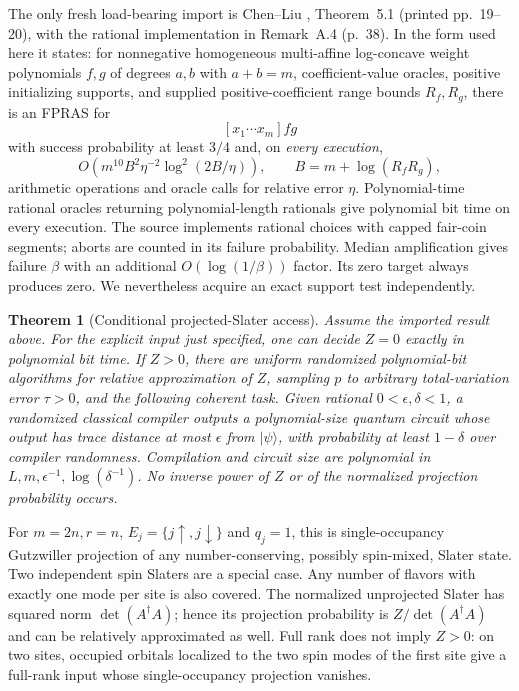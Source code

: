 \documentclass[11pt]{article}
\newtheorem{theorem}{Theorem}
\theoremstyle{remark}
\newcommand{\ket}[1]{\lvert #1\rangle}
\begin{document}
The only fresh load-bearing import is Chen--Liu \cite{CL}, Theorem~5.1 (printed pp.~19--20), with the rational implementation in Remark~A.4 (p.~38). In the form used here it states: for nonnegative homogeneous multi-affine log-concave weight polynomials $f,g$ of degrees $a,b$ with $a+b=m$, coefficient-value oracles, positive initializing supports, and supplied positive-coefficient range bounds $R_f,R_g$, there is an FPRAS for
\begin{equation}\label{eq:import}
 [x_1\cdots x_m]fg
\end{equation}
with success probability at least $3/4$ and, on \emph{every execution},
\begin{equation}\label{eq:cost}
 O\!\left(m^{10}B^2\eta^{-2}\log^2(2B/\eta)\right),
 \qquad B=m+\log(R_fR_g),
\end{equation}
arithmetic operations and oracle calls for relative error $\eta$. Polynomial-time rational oracles returning polynomial-length rationals give polynomial bit time on every execution. The source implements rational choices with capped fair-coin segments; aborts are counted in its failure probability. Median amplification gives failure $\beta$ with an additional $O(\log(1/\beta))$ factor. Its zero target always produces zero. We nevertheless acquire an exact support test independently.

\begin{theorem}[Conditional projected-Slater access]\label{thm:main}
Assume the imported result above. For the explicit input just specified, one can decide $Z=0$ exactly in polynomial bit time. If $Z>0$, there are uniform randomized polynomial-bit algorithms for relative approximation of $Z$, sampling $p$ to arbitrary total-variation error $\tau>0$, and the following coherent task. Given rational $0<\epsilon,\delta<1$, a randomized classical compiler outputs a polynomial-size quantum circuit whose output has trace distance at most $\epsilon$ from $\ket\psi$, with probability at least $1-\delta$ over compiler randomness. Compilation and circuit size are polynomial in $L,m,\epsilon^{-1},\log(\delta^{-1})$. No inverse power of $Z$ or of the normalized projection probability occurs.
\end{theorem}

For $m=2n,r=n$, $E_j=\{j\uparrow,j\downarrow\}$ and $q_j=1$, this is single-occupancy Gutzwiller projection of any number-conserving, possibly spin-mixed, Slater state. Two independent spin Slaters are a special case. Any number of flavors with exactly one mode per site is also covered. The normalized unprojected Slater has squared norm $\det(A^\dagger A)$; hence its projection probability is $Z/\det(A^\dagger A)$ and can be relatively approximated as well. Full rank does not imply $Z>0$: on two sites, occupied orbitals localized to the two spin modes of the first site give a full-rank input whose single-occupancy projection vanishes.
\end{document}
